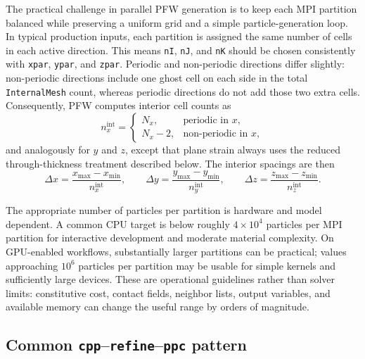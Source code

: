 The practical challenge in parallel PFW generation is to keep each MPI partition balanced while preserving a uniform grid and a simple particle-generation loop.  In typical production inputs, each partition is assigned the same number of cells in each active direction.  This means \texttt{nI}, \texttt{nJ}, and \texttt{nK} should be chosen consistently with \texttt{xpar}, \texttt{ypar}, and \texttt{zpar}.  Periodic and non-periodic directions differ slightly: non-periodic directions include one ghost cell on each side in the total \texttt{InternalMesh} count, whereas periodic directions do not add those two extra cells.  Consequently, PFW computes interior cell counts as
\begin{equation}
  n_x^{\mathrm{int}} =
  \begin{cases}
  N_x, & \text{periodic in }x,\\
  N_x-2, & \text{non-periodic in }x,
  \end{cases}
\end{equation}
and analogously for \(y\) and \(z\), except that plane strain always uses the reduced through-thickness treatment described below.  The interior spacings are then
\begin{equation}
  \Delta x = \frac{x_{\max}-x_{\min}}{n_x^{\mathrm{int}}}, \qquad
  \Delta y = \frac{y_{\max}-y_{\min}}{n_y^{\mathrm{int}}}, \qquad
  \Delta z = \frac{z_{\max}-z_{\min}}{n_z^{\mathrm{int}}}.
\end{equation}

The appropriate number of particles per partition is hardware and model dependent.  A common CPU target is below roughly \(4\times 10^4\) particles per MPI partition for interactive development and moderate material complexity.  On GPU-enabled workflows, substantially larger partitions can be practical; values approaching \(10^6\) particles per partition may be usable for simple kernels and sufficiently large devices.  These are operational guidelines rather than solver limits: constitutive cost, contact fields, neighbor lists, output variables, and available memory can change the useful range by orders of magnitude.

\subsection{Common \texttt{cpp}--\texttt{refine}--\texttt{ppc} pattern}

